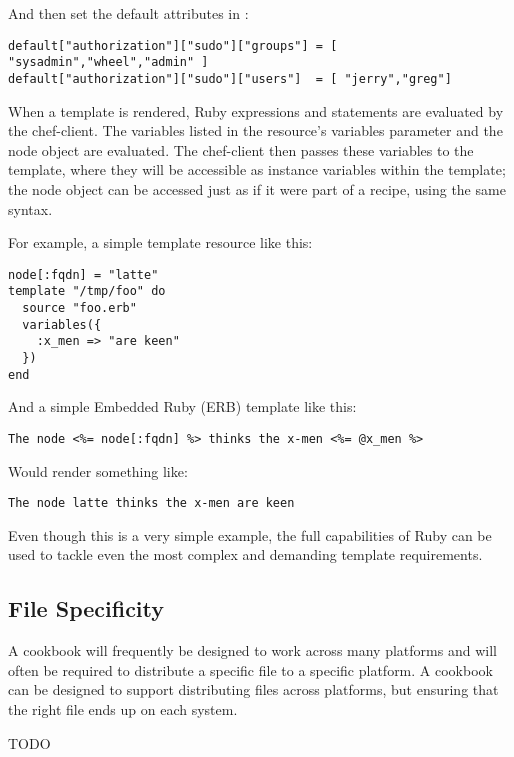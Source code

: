 And then set the default attributes in :

\begin{lstlisting}[label=lst:cookbook-templates3]
default["authorization"]["sudo"]["groups"] = [ "sysadmin","wheel","admin" ]
default["authorization"]["sudo"]["users"]  = [ "jerry","greg"]
\end{lstlisting}

When a template is rendered, Ruby expressions and statements are evaluated by the chef-client. The variables listed in the resource’s variables parameter and the node object are evaluated. The chef-client then passes these variables to the template, where they will be accessible as instance variables within the template; the node object can be accessed just as if it were part of a recipe, using the same syntax.

For example, a simple template resource like this:

\begin{lstlisting}[label=lst:cookbook-templates4]
node[:fqdn] = "latte"
template "/tmp/foo" do
  source "foo.erb"
  variables({
    :x_men => "are keen"
  })
end
\end{lstlisting}

And a simple Embedded Ruby (ERB) template like this:

\begin{lstlisting}[label=lst:cookbook-templates5]
The node <%= node[:fqdn] %> thinks the x-men <%= @x_men %>
\end{lstlisting}

Would render something like:

\begin{lstlisting}[label=lst:cookbook-templates6]
The node latte thinks the x-men are keen
\end{lstlisting}

Even though this is a very simple example, the full capabilities of Ruby can be used to tackle even the most complex and demanding template requirements.

\subsection{File Specificity}

A cookbook will frequently be designed to work across many platforms and will often be required to distribute a specific file to a specific platform. A cookbook can be designed to support distributing files across platforms, but ensuring that the right file ends up on each system.

TODO